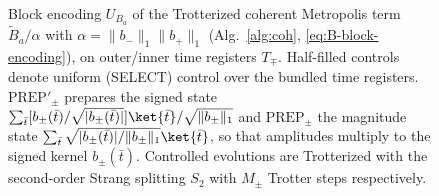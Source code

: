 \begin{figure}[ht]
  \centering
  \caption{Block encoding $U_{B_a}$ of the Trotterized coherent
  Metropolis term $\tilde{B}_a/\alpha$ with $\alpha=\lVert b_-\rVert_1\lVert b_+\rVert_1$
  (Alg.~\ref*{alg:coh}, \eqref{eq:B-block-encoding}), on outer/inner time
  registers $T_\mp$. Half-filled controls denote uniform (SELECT) control
  over the bundled time registers.
  $\text{PREP}'_\pm$ prepares the signed state
  $\sum_{\bar t}[b_\pm(\bar t)/\sqrt{|b_\pm(\bar t)|}]\ket{\bar t}/\sqrt{\lVert b_\pm\rVert_1}$
  and $\text{PREP}_\pm$ the magnitude state
  $\sum_{\bar t}\sqrt{|b_\pm(\bar t)|/\lVert b_\pm\rVert_1}\ket{\bar t}$,
  so that amplitudes multiply to the signed kernel $b_\pm(\bar t)$. Controlled
  evolutions are Trotterized with the second-order Strang splitting $S_2$ with $M_\pm$ Trotter steps respectively.}
  \label{circ:U_B_a}
\end{figure}

